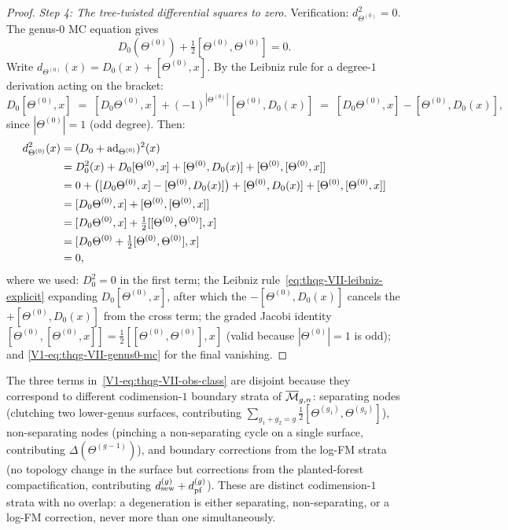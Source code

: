 \begin{proof}
\medskip\noindent\emph{Step 4: The tree-twisted differential squares to zero.}
Verification: $d_{\Theta^{(0)}}^2 = 0$. The genus-$0$ MC equation gives
\begin{equation}%
D_0(\Theta^{(0)}) + \tfrac{1}{2}[\Theta^{(0)},\Theta^{(0)}] = 0.
\end{equation}
Write $d_{\Theta^{(0)}}(x) = D_0(x) + [\Theta^{(0)}, x]$.
By the Leibniz rule for a degree-$1$ derivation acting on the bracket:
\begin{equation}\label{eq:thqg-VII-leibniz-explicit}
D_0[\Theta^{(0)}, x]
\;=\;
[D_0\Theta^{(0)}, x]
+ (-1)^{|\Theta^{(0)}|}[\Theta^{(0)}, D_0(x)]
\;=\;
[D_0\Theta^{(0)}, x]
- [\Theta^{(0)}, D_0(x)],
\end{equation}
since $|\Theta^{(0)}| = 1$ (odd degree).
Then:
\begin{align}
d_{\Theta^{(0)}}^2(x)
&= (D_0 + \operatorname{ad}_{\Theta^{(0)}})^2(x)\notag\\
&= D_0^2(x) + D_0[\Theta^{(0)},x]
 + [\Theta^{(0)}, D_0(x)]
 + [\Theta^{(0)},[\Theta^{(0)},x]]\notag\\
&= 0
 + \bigl([D_0\Theta^{(0)}, x]
 - [\Theta^{(0)}, D_0(x)]\bigr)
 + [\Theta^{(0)}, D_0(x)]
 + [\Theta^{(0)},[\Theta^{(0)},x]]\notag\\
&= [D_0\Theta^{(0)}, x]
 + [\Theta^{(0)},[\Theta^{(0)},x]]\notag\\
&= [D_0\Theta^{(0)}, x]
 + \tfrac{1}{2}[[\Theta^{(0)},\Theta^{(0)}], x]\notag\\
&= [D_0\Theta^{(0)}
 + \tfrac{1}{2}[\Theta^{(0)},\Theta^{(0)}], x]\notag\\
&= 0,
\end{align}
where we used: $D_0^2 = 0$ in the first term; the Leibniz
rule~\eqref{eq:thqg-VII-leibniz-explicit} expanding
$D_0[\Theta^{(0)},x]$, after which the
$-[\Theta^{(0)}, D_0(x)]$ cancels the $+[\Theta^{(0)}, D_0(x)]$
from the cross term; the graded Jacobi identity
$[\Theta^{(0)},[\Theta^{(0)},x]] = \tfrac{1}{2}
[[\Theta^{(0)},\Theta^{(0)}], x]$
(valid because $|\Theta^{(0)}| = 1$ is odd); and
\eqref{V1-eq:thqg-VII-genus0-mc} for the final vanishing.
\end{proof}

\begin{remark}
The three terms in~\eqref{V1-eq:thqg-VII-obs-class} are disjoint
because they correspond to different codimension-$1$ boundary strata
of $\overline{\mathcal{M}}_{g,n}$: separating nodes (clutching two
lower-genus surfaces, contributing
$\sum_{g_1+g_2=g} \tfrac{1}{2}[\Theta^{(g_1)},\Theta^{(g_2)}]$),
non-separating nodes (pinching a non-separating cycle on a single
surface, contributing $\Delta(\Theta^{(g-1)})$), and boundary
corrections from the log-FM strata (no topology change in the
surface but corrections from the planted-forest compactification,
contributing $d_{\mathrm{sew}}^{(g)} + d_{\mathrm{pf}}^{(g)}$). These are distinct
codimension-$1$ strata with no overlap: a degeneration is either
separating, non-separating, or a log-FM correction, never more
than one simultaneously.
\end{remark}

